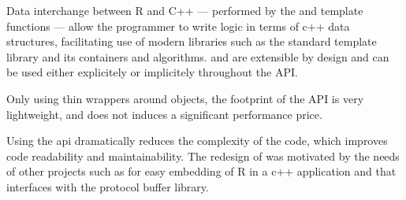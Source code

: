 Data interchange between R and C++ --- performed by the 
 and  template functions --- allow the programmer
to write logic in terms of c++ data structures, facilitating use
of modern libraries such as the standard template library and its 
containers and algorithms.  and  are extensible
by design and can be used either explicitely or implicitely throughout 
the API. 

Only using thin wrappers around  objects, 
the footprint of the  API is very lightweight, and does not 
induces a significant performance price. 

Using the  api dramatically reduces the complexity 
of the code, which improves code readability and maintainability.
The redesign of  was motivated by the needs of other 
projects such as  for easy embedding 
of R in a c++ application and  \citep{cran:rprotobuf} 
that interfaces with the protocol buffer library. 



\address{Dirk Eddelbuettel\\
  Debian Project\\
  Chicago, IL\\
  USA}\\

\address{Romain Fran\c{c}ois\\
  Professionnal R Enthusiast\\
  3 rue Emile Bonnet, 34 090 Montpellier\\
  FRANCE}\\

